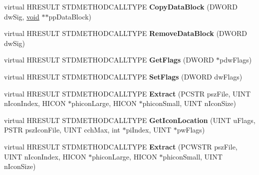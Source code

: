 \begin{DoxyCompactItemize}
\item 
\mbox{\label{class_c_shell_link_aeec7f6e19d0ce4bf4c6534572a4a3774}} 
virtual H\+R\+E\+S\+U\+LT S\+T\+D\+M\+E\+T\+H\+O\+D\+C\+A\+L\+L\+T\+Y\+PE {\bfseries Copy\+Data\+Block} (D\+W\+O\+RD dw\+Sig, \hyperlink{interfacevoid}{void} $\ast$$\ast$pp\+Data\+Block)
\item 
\mbox{\label{class_c_shell_link_a2635638995a9c6d35d1f0847b0d294a3}} 
virtual H\+R\+E\+S\+U\+LT S\+T\+D\+M\+E\+T\+H\+O\+D\+C\+A\+L\+L\+T\+Y\+PE {\bfseries Remove\+Data\+Block} (D\+W\+O\+RD dw\+Sig)
\item 
\mbox{\label{class_c_shell_link_a980c9a3349a364e8275bc620cb95f7b5}} 
virtual H\+R\+E\+S\+U\+LT S\+T\+D\+M\+E\+T\+H\+O\+D\+C\+A\+L\+L\+T\+Y\+PE {\bfseries Get\+Flags} (D\+W\+O\+RD $\ast$pdw\+Flags)
\item 
\mbox{\label{class_c_shell_link_acd87480bb308ab113acfc0e69e779875}} 
virtual H\+R\+E\+S\+U\+LT S\+T\+D\+M\+E\+T\+H\+O\+D\+C\+A\+L\+L\+T\+Y\+PE {\bfseries Set\+Flags} (D\+W\+O\+RD dw\+Flags)
\item 
\mbox{\label{class_c_shell_link_ab4685979dcc422738d08dad3ac5be09e}} 
virtual H\+R\+E\+S\+U\+LT S\+T\+D\+M\+E\+T\+H\+O\+D\+C\+A\+L\+L\+T\+Y\+PE {\bfseries Extract} (P\+C\+S\+TR psz\+File, U\+I\+NT n\+Icon\+Index, H\+I\+C\+ON $\ast$phicon\+Large, H\+I\+C\+ON $\ast$phicon\+Small, U\+I\+NT n\+Icon\+Size)
\item 
\mbox{\label{class_c_shell_link_a8e8387f89c5973509e79c5437144ba70}} 
virtual H\+R\+E\+S\+U\+LT S\+T\+D\+M\+E\+T\+H\+O\+D\+C\+A\+L\+L\+T\+Y\+PE {\bfseries Get\+Icon\+Location} (U\+I\+NT u\+Flags, P\+S\+TR psz\+Icon\+File, U\+I\+NT cch\+Max, int $\ast$pi\+Index, U\+I\+NT $\ast$pw\+Flags)
\item 
\mbox{\label{class_c_shell_link_a39fd7cc635e7e2ff37fbf125ad0256d2}} 
virtual H\+R\+E\+S\+U\+LT S\+T\+D\+M\+E\+T\+H\+O\+D\+C\+A\+L\+L\+T\+Y\+PE {\bfseries Extract} (P\+C\+W\+S\+TR psz\+File, U\+I\+NT n\+Icon\+Index, H\+I\+C\+ON $\ast$phicon\+Large, H\+I\+C\+ON $\ast$phicon\+Small, U\+I\+NT n\+Icon\+Size)
\item 
\mbox{\label{class_c_shell_link_a0e19729f224a71c5ac9e3127aaf445a4}} 
$$
\end{DoxyCompactItemize}
